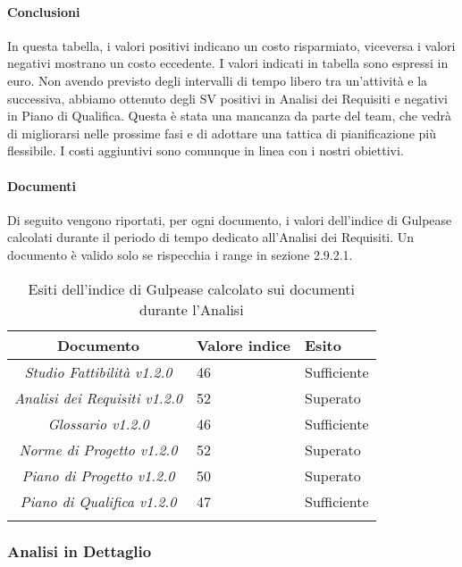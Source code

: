 \paragraph{Conclusioni}
In questa tabella, i valori positivi indicano un costo risparmiato, viceversa i valori negativi mostrano un costo eccedente.
I valori indicati in tabella sono espressi in euro.
Non avendo previsto degli intervalli di tempo libero tra un'attività e la successiva, abbiamo ottenuto degli SV positivi in Analisi dei Requisiti e negativi in Piano di Qualifica.
Questa è stata una mancanza da parte del team, che vedrà di migliorarsi nelle prossime fasi e di adottare una tattica di pianificazione più flessibile.
I costi aggiuntivi sono comunque in linea con i nostri obiettivi.

\paragraph{Documenti}
Di seguito vengono riportati, per ogni documento, i valori dell'indice di Gulpease calcolati durante il periodo di tempo dedicato all'Analisi dei Requisiti. Un documento è valido solo se rispecchia i range in sezione 2.9.2.1.
\begin{longtable}{|c|p{3cm}|p{3cm}|}
\toprule
\textbf{Documento} & \textbf{Valore indice} & \textbf{Esito} \\


\midrule
\emph{Studio Fattibilità v1.2.0} & 46 & Sufficiente\\
\midrule
\emph{Analisi dei Requisiti v1.2.0} & 52 & Superato\\
\midrule
\emph{Glossario v1.2.0} & 46 & Sufficiente\\
\midrule
\emph{Norme di Progetto v1.2.0} & 52 & Superato\\
\midrule
\emph{Piano di Progetto v1.2.0} & 50 & Superato\\
\midrule
\emph{Piano di Qualifica v1.2.0} & 47 & Sufficiente\\
\bottomrule
\caption{Esiti dell'indice di Gulpease calcolato sui documenti durante l'Analisi}
\label{tab:changelog}
\end{longtable}

\subsubsection{Analisi in Dettaglio}
